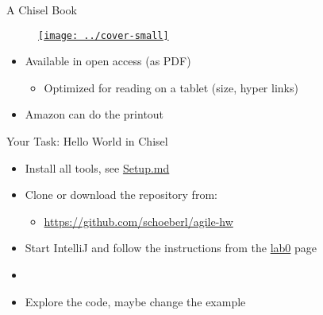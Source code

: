 \begin{frame}[fragile]{A Chisel Book}
\begin{figure}
    \centering
    \href{https://github.com/schoeberl/chisel-book}{\texttt{[image: ../cover-small]}}
\end{figure}

\begin{itemize}
\item Available in open access (as PDF)
\begin{itemize}
\item Optimized for reading on a tablet (size, hyper links)
\end{itemize}
\item Amazon can do the printout
\end{itemize}
\end{frame}


\begin{frame}[fragile]{Your Task: Hello World in Chisel}
\begin{itemize}
\item Install all tools, see \href{https://github.com/schoeberl/agile-hw/blob/main/Setup.md}{Setup.md}
\item Clone or download the repository from:
\begin{itemize}
\item \url{https://github.com/schoeberl/agile-hw}
\end{itemize}
\item Start IntelliJ and follow the instructions from the \href{https://github.com/schoeberl/agile-hw/tree/main/lab0}{lab0} page 
\item {}
\item Explore the code, maybe change the example
\end{itemize}
\end{frame}



